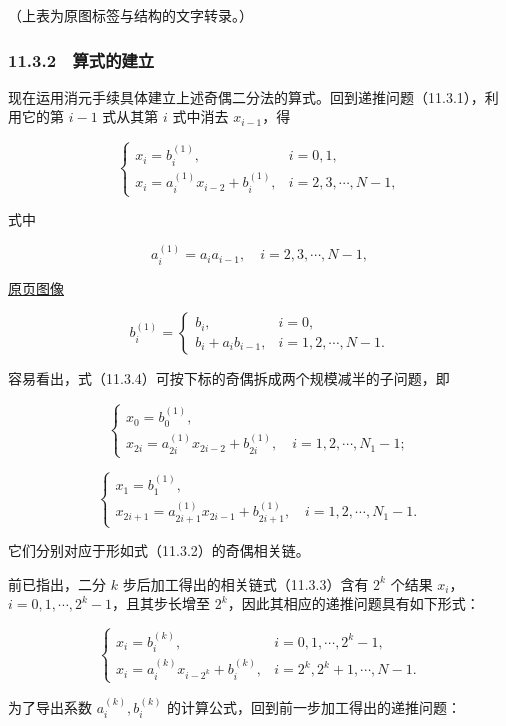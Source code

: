 \documentclass[
  10pt,
  fontset=fandol]{ctexart}
\begin{document}
（上表为原图标签与结构的文字转录。）

\subsubsection{11.3.2　算式的建立}\label{ux7b97ux5f0fux7684ux5efaux7acb}

现在运用消元手续具体建立上述奇偶二分法的算式。回到递推问题（11.3.1），利用它的第 \(i-1\) 式从其第 \(i\) 式中消去 \(x_{i-1}\)，得

\[
\begin{cases}
x_i=b_i^{(1)},& i=0,1,\\
x_i=a_i^{(1)}x_{i-2}+b_i^{(1)},& i=2,3,\cdots,N-1,
\end{cases}
\tag{11.3.4}
\]

式中

\[
a_i^{(1)}=a_i a_{i-1},\quad i=2,3,\cdots,N-1,
\tag{11.3.5}
\]

\href{../../source-images/pdf-287.jpeg}{原页图像}

\[
b_i^{(1)}=
\begin{cases}
b_i,& i=0,\\
b_i+a_i b_{i-1},& i=1,2,\cdots,N-1.
\end{cases}
\tag{11.3.6}
\]

容易看出，式（11.3.4）可按下标的奇偶拆成两个规模减半的子问题，即

\[
\begin{cases}
x_0=b_0^{(1)},\\
x_{2i}=a_{2i}^{(1)}x_{2i-2}+b_{2i}^{(1)},\quad i=1,2,\cdots,N_1-1;
\end{cases}
\]

\[
\begin{cases}
x_1=b_1^{(1)},\\
x_{2i+1}=a_{2i+1}^{(1)}x_{2i-1}+b_{2i+1}^{(1)},\quad i=1,2,\cdots,N_1-1.
\end{cases}
\]

它们分别对应于形如式（11.3.2）的奇偶相关链。

前已指出，二分 \(k\) 步后加工得出的相关链式（11.3.3）含有 \(2^k\) 个结果 \(x_i\)，\(i=0,1,\cdots,2^k-1\)，且其步长增至 \(2^k\)，因此其相应的递推问题具有如下形式：

\[
\begin{cases}
x_i=b_i^{(k)},& i=0,1,\cdots,2^k-1,\\
x_i=a_i^{(k)}x_{i-2^k}+b_i^{(k)},& i=2^k,2^k+1,\cdots,N-1.
\end{cases}
\tag{11.3.7}
\]

为了导出系数 \(a_i^{(k)},b_i^{(k)}\) 的计算公式，回到前一步加工得出的递推问题：
\end{document}
